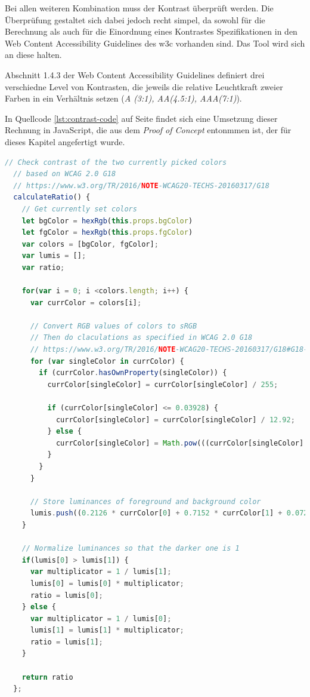 Bei allen weiteren Kombination muss der Kontrast überprüft werden. Die Überprüfung gestaltet sich dabei jedoch recht simpel, da sowohl für die Berechnung als auch für die Einordnung eines Kontrastes Spezifikationen in den Web Content Accessibility Guidelines des w3c \cite{w3c2016g18} vorhanden sind. Das Tool wird sich an diese halten.

Abschnitt 1.4.3 der Web Content Accessibility Guidelines definiert drei verschiedne Level von Kontrasten, die jeweils die relative Leuchtkraft zweier Farben in ein Verhältnis setzen (\textit{A (3:1), AA(4.5:1), AAA(7:1)}).

In Quellcode \ref{lst:contrast-code} auf Seite \pageref{lst:contrast-code} findet sich eine Umsetzung dieser Rechnung in JavaScript, die aus dem \textit{Proof of Concept} entonmmen ist, der für dieses Kapitel angefertigt wurde.

\begin{lstlisting}[caption={Berechnung des Kontrastverhältnisses zweier Farben nach WCAG 2.0 in JavaScript}, label={lst:contrast-code}, language=javascript]
  // Check contrast of the two currently picked colors
  // based on WCAG 2.0 G18
  // https://www.w3.org/TR/2016/NOTE-WCAG20-TECHS-20160317/G18
  calculateRatio() {
    // Get currently set colors
    let bgColor = hexRgb(this.props.bgColor)
    let fgColor = hexRgb(this.props.fgColor)
    var colors = [bgColor, fgColor];
    var lumis = [];
    var ratio;

    for(var i = 0; i <colors.length; i++) {
      var currColor = colors[i];

      // Convert RGB values of colors to sRGB
      // Then do claculations as specified in WCAG 2.0 G18
      // https://www.w3.org/TR/2016/NOTE-WCAG20-TECHS-20160317/G18#G18-tests
      for (var singleColor in currColor) {
        if (currColor.hasOwnProperty(singleColor)) {
          currColor[singleColor] = currColor[singleColor] / 255;

          if (currColor[singleColor] <= 0.03928) {
            currColor[singleColor] = currColor[singleColor] / 12.92;
          } else {
            currColor[singleColor] = Math.pow(((currColor[singleColor] + 0.055) / 1.055), 2.4);
          }
        }
      }

      // Store luminances of foreground and background color
      lumis.push((0.2126 * currColor[0] + 0.7152 * currColor[1] + 0.0722 * currColor[2]) + 0.05);
    }

    // Normalize luminances so that the darker one is 1
    if(lumis[0] > lumis[1]) {
      var multiplicator = 1 / lumis[1];
      lumis[0] = lumis[0] * multiplicator;
      ratio = lumis[0];
    } else {
      var multiplicator = 1 / lumis[0];
      lumis[1] = lumis[1] * multiplicator;
      ratio = lumis[1];
    }

    return ratio
  };
\end{lstlisting}


